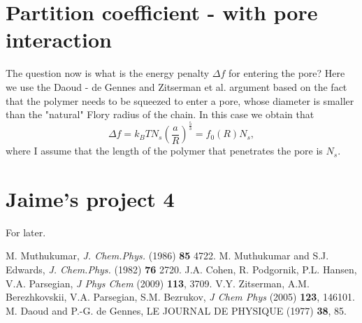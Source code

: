 \documentclass[11pt,a4paper]{article}
\begin{document}
\section{Partition coefficient - with pore interaction}

The question now is what is the energy penalty $\Delta f$ for entering the pore? Here we use the Daoud - de Gennes \cite{Daoud} and Zitserman et al. \cite{sergey} argument based on the
fact that the polymer needs to be squeezed to enter a pore, whose diameter is smaller than the "natural" Flory radius of the chain. In this case we obtain that
\begin{equation}
\Delta f = k_BT N_s \left( \frac{a}{R}\right)^{\frac53} = f_0(R) N_s,
\end{equation}
where I assume that the length of the polymer that penetrates the pore is $N_s$. 

\section{Jaime's project 4}

For later.

\begin{thebibliography}{9}
 M. Muthukumar, {\sl J. Chem.Phys.} (1986) {\bf 85} 4722.
 M. Muthukumar and S.J. Edwards,  {\sl J. Chem.Phys.} (1982) {\bf 76} 2720.
 J.A. Cohen, R. Podgornik, P.L. Hansen, V.A. Parsegian, {\sl J Phys Chem} (2009) {\bf 113}, 3709.
  V.Y. Zitserman,  A.M.  Berezhkovskii,  V.A. Parsegian,  S.M. Bezrukov, {\sl J Chem Phys} (2005) {\bf 123}, 146101.
 M. Daoud and P.-G. de Gennes, LE JOURNAL DE PHYSIQUE (1977) {\bf 38}, 85.
\end{thebibliography}
\end{document}
